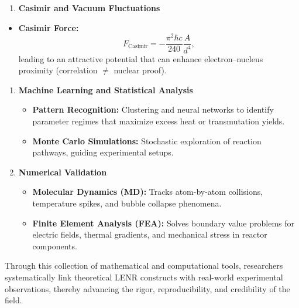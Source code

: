 \documentclass[11pt,a4paper]{article}
\begin{document}
\begin{enumerate}
\def\labelenumi{\arabic{enumi}.}
\setcounter{enumi}{5}
\item
  \textbf{Casimir and Vacuum Fluctuations}
\end{enumerate}

\begin{itemize}
\item
  \textbf{Casimir Force:} \begin{equation}
F_{\text{Casimir}} = -\frac{\pi^2 \hbar c}{240}\frac{A}{d^4},
\end{equation} leading to an attractive potential that can enhance electron--nucleus proximity (correlation $\neq$ nuclear proof).
\end{itemize}

\begin{enumerate}
\def\labelenumi{\arabic{enumi}.}
\setcounter{enumi}{6}
\item
  \textbf{Machine Learning and Statistical Analysis}

  \begin{itemize}
    \item
    \textbf{Pattern Recognition:} Clustering and neural networks to identify parameter regimes that maximize excess heat or transmutation yields.\\
  \item
    \textbf{Monte Carlo Simulations:} Stochastic exploration of reaction pathways, guiding experimental setups.\\
  \end{itemize}
\item
  \textbf{Numerical Validation}

  \begin{itemize}
    \item
    \textbf{Molecular Dynamics (MD):} Tracks atom-by-atom collisions, temperature spikes, and bubble collapse phenomena.\\
  \item
    \textbf{Finite Element Analysis (FEA):} Solves boundary value problems for electric fields, thermal gradients, and mechanical stress in reactor components.
  \end{itemize}
\end{enumerate}

Through this collection of mathematical and computational tools, researchers systematically link theoretical LENR constructs with real-world experimental observations, thereby advancing the rigor, reproducibility, and credibility of the field.
\end{document}
